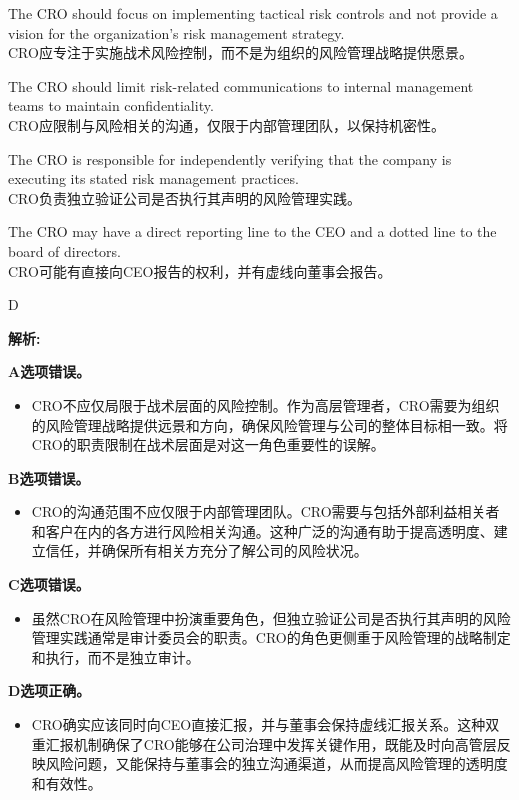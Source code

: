 \documentclass{article}
\newenvironment{explanation}
{\textbf{解析:}\par}
{\par}
\begin{document}
\begin{choices}
        \item The CRO should focus on implementing tactical risk controls and not provide a vision for the organization's risk management strategy. \\
        CRO应专注于实施战术风险控制，而不是为组织的风险管理战略提供愿景。
        \item The CRO should limit risk-related communications to internal management teams to maintain confidentiality. \\
        CRO应限制与风险相关的沟通，仅限于内部管理团队，以保持机密性。
        \item The CRO is responsible for independently verifying that the company is executing its stated risk management practices. \\
        CRO负责独立验证公司是否执行其声明的风险管理实践。
        \item The CRO may have a direct reporting line to the CEO and a dotted line to the board of directors. \\
        CRO可能有直接向CEO报告的权利，并有虚线向董事会报告。
\end{choices}


\begin{correctanswer}
    D
\end{correctanswer}

\begin{explanation}
    \textbf{A选项错误。}
    \begin{itemize}
        \item CRO不应仅局限于战术层面的风险控制。作为高层管理者，CRO需要为组织的风险管理战略提供远景和方向，确保风险管理与公司的整体目标相一致。将CRO的职责限制在战术层面是对这一角色重要性的误解。
    \end{itemize}
    
    \textbf{B选项错误。}
    \begin{itemize}
        \item CRO的沟通范围不应仅限于内部管理团队。CRO需要与包括外部利益相关者和客户在内的各方进行风险相关沟通。这种广泛的沟通有助于提高透明度、建立信任，并确保所有相关方充分了解公司的风险状况。
    \end{itemize}
    
    \textbf{C选项错误。}
    \begin{itemize}
        \item 虽然CRO在风险管理中扮演重要角色，但独立验证公司是否执行其声明的风险管理实践通常是审计委员会的职责。CRO的角色更侧重于风险管理的战略制定和执行，而不是独立审计。
    \end{itemize}
    
    \textbf{D选项正确。}
    \begin{itemize}
        \item CRO确实应该同时向CEO直接汇报，并与董事会保持虚线汇报关系。这种双重汇报机制确保了CRO能够在公司治理中发挥关键作用，既能及时向高管层反映风险问题，又能保持与董事会的独立沟通渠道，从而提高风险管理的透明度和有效性。
    \end{itemize}
\end{explanation}
\end{document}
